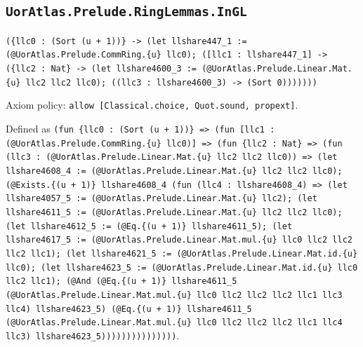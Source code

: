 \documentclass[11pt]{article}
\begin{document}
\subsection*{\texttt{UorAtlas.Prelude.RingLemmas.InGL}}
\noindent\texttt{(\{llc0 : (Sort (u + 1))\} -> (let llshare447\_1 := (@UorAtlas.Prelude.CommRing.\{u\} llc0); ([llc1 : llshare447\_1] -> (\{llc2 : Nat\} -> (let llshare4600\_3 := (@UorAtlas.Prelude.Linear.Mat.\{u\} llc2 llc2 llc0); ((llc3 : llshare4600\_3) -> (Sort 0)))))))}\par
\noindent Axiom policy: \texttt{allow [Classical.choice, Quot.sound, propext]}.\par
\noindent Defined as \texttt{(fun \{llc0 : (Sort (u + 1))\} => (fun [llc1 : (@UorAtlas.Prelude.CommRing.\{u\} llc0)] => (fun \{llc2 : Nat\} => (fun (llc3 : (@UorAtlas.Prelude.Linear.Mat.\{u\} llc2 llc2 llc0)) => (let llshare4608\_4 := (@UorAtlas.Prelude.Linear.Mat.\{u\} llc2 llc2 llc0); (@Exists.\{(u + 1)\} llshare4608\_4 (fun (llc4 : llshare4608\_4) => (let llshare4057\_5 := (@UorAtlas.Prelude.Linear.Mat.\{u\} llc2); (let llshare4611\_5 := (@UorAtlas.Prelude.Linear.Mat.\{u\} llc2 llc2 llc0); (let llshare4612\_5 := (@Eq.\{(u + 1)\} llshare4611\_5); (let llshare4617\_5 := (@UorAtlas.Prelude.Linear.Mat.mul.\{u\} llc0 llc2 llc2 llc2 llc1); (let llshare4621\_5 := (@UorAtlas.Prelude.Linear.Mat.id.\{u\} llc0); (let llshare4623\_5 := (@UorAtlas.Prelude.Linear.Mat.id.\{u\} llc0 llc2 llc1); (@And (@Eq.\{(u + 1)\} llshare4611\_5 (@UorAtlas.Prelude.Linear.Mat.mul.\{u\} llc0 llc2 llc2 llc2 llc1 llc3 llc4) llshare4623\_5) (@Eq.\{(u + 1)\} llshare4611\_5 (@UorAtlas.Prelude.Linear.Mat.mul.\{u\} llc0 llc2 llc2 llc2 llc1 llc4 llc3) llshare4623\_5)))))))))))))))}.\par
\end{document}
